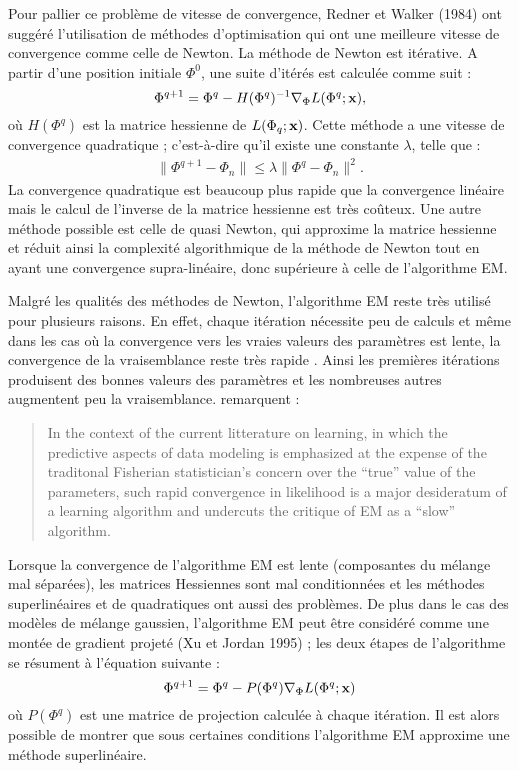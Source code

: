 Pour pallier ce probl\`eme de vitesse de convergence, Redner et Walker (1984)
ont sugg\'er\'e l'utilisation de m\'ethodes d'optimisation qui ont une
meilleure vitesse de convergence comme celle de Newton. La m\'ethode de Newton
est it\'erative. A partir d'une position initiale $\Phi^0$, une suite d'it\'er\'es
est  calcul\'ee comme suit :
\begin{equation}
\Phi^{q+1}=\Phi^q - H(\Phi^q)^{-1}\nabla_{\Phi} L(\Phi^q;\mbox{\bf x}),
\end{equation}
o\`u $H(\Phi^q)$ est la matrice hessienne de $L(\Phi_q;\mbox{\bf x})$. Cette m\'ethode a
une vitesse de convergence quadratique ; c'est-\`a-dire qu'il existe  une constante
$\lambda$, telle que :
\begin{eqnarray*}
\|\Phi^{q+1}- \Phi_n\| \leq \lambda \|  \Phi^{q}- \Phi_n \|^2 .
\end{eqnarray*}
La convergence quadratique est beaucoup plus rapide que la convergence lin\'eaire
mais le calcul de l'inverse de la matrice hessienne est tr\`es co\^uteux. 
Une autre m\'ethode possible est celle de quasi Newton, qui approxime
la matrice hessienne  et r\'eduit ainsi la complexit\'e algorithmique
de la m\'ethode de Newton tout en ayant une convergence supra-lin\'eaire,
donc sup\'erieure \`a celle de l'algorithme EM.

 
Malgr\'e les qualit\'es des m\'ethodes de Newton, l'algorithme EM reste tr\`es
utilis\'e pour plusieurs raisons. En effet, chaque it\'eration n\'ecessite peu de calculs
et m\^eme dans les cas o\`u la convergence vers les vraies valeurs des param\`etres est lente,
la convergence de la vraisemblance reste tr\`es rapide \cite{Redner1984}. Ainsi
les premi\`eres it\'erations produisent des bonnes valeurs des param\`etres et les 
nombreuses autres augmentent peu la vraisemblance.  remarquent :
\begin{quotation}
In the context of the current litterature on learning, in which the predictive aspects of
data modeling is emphasized at the expense of the traditonal Fisherian statistician's
concern over the ``true'' value of the parameters, such rapid convergence in 
likelihood is a major desideratum of a learning algorithm and undercuts the critique of EM
as a ``slow'' algorithm.
\end{quotation}

Lorsque la convergence de l'algorithme EM est lente (composantes du m\'elange 
mal s\'epar\'ees), les matrices Hessiennes sont mal conditionn\'ees et
les m\'ethodes superlin\'eaires et de quadratiques ont aussi des probl\`emes.
De plus dans le cas des mod\`eles de m\'elange gaussien, l'algorithme EM peut
\^etre consid\'er\'e comme une mont\'ee de gradient projet\'e (Xu et Jordan 1995) ; les
deux \'etapes de l'algorithme  se r\'esument \`a l'\'equation suivante :
\begin{equation}
\Phi^{q+1}=\Phi^q - P(\Phi^q) \nabla_{\Phi} L(\Phi^q;\mbox{\bf x})
\end{equation}
o\`u $P(\Phi^q)$ est une matrice de projection calcul\'ee \`a chaque it\'eration.
Il est alors possible de montrer que sous certaines conditions l'algorithme EM approxime une m\'ethode superlin\'eaire.






